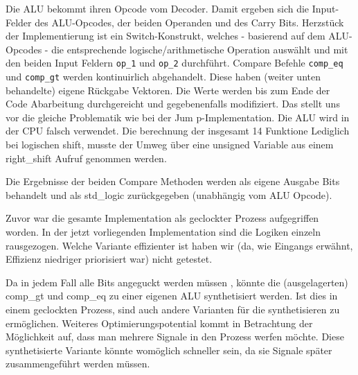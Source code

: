 \documentclass[paper=a4,fontsize=12pt,twocolumn]{scrreprt}
\begin{document}
Die ALU bekommt ihren Opcode vom Decoder.
Damit ergeben sich die Input-Felder des ALU-Opcodes, der beiden Operanden und des Carry Bits.
Herzstück der Implementierung ist ein Switch-Konstrukt, welches - basierend auf dem ALU-Opcodes - die entsprechende logische/arithmetische Operation auswählt und mit den beiden Input Feldern \texttt{op\_1} und \texttt{op\_2} durchführt.
Compare Befehle \texttt{comp\_eq} und \texttt{comp\_gt} werden kontinuirlich abgehandelt. Diese haben (weiter unten behandelte) eigene Rückgabe Vektoren.
Die Werte werden bis zum Ende der Code Abarbeitung durchgereicht und gegebenenfalls modifiziert.
Das stellt uns vor die gleiche Problematik wie bei der Jum
p-Implementation. Die ALU wird in der CPU falsch verwendet.
Die berechnung der insgesamt 14 Funktione Lediglich bei logischen shift, musste der Umweg über eine unsigned Variable aus einem right\_shift Aufruf genommen werden. 

Die Ergebnisse der beiden Compare Methoden werden als eigene Ausgabe Bits behandelt und als std\_logic zurückgegeben (unabhängig vom ALU Opcode).










Zuvor war die gesamte Implementation als geclockter Prozess aufgegriffen worden. In der jetzt vorliegenden Implementation sind die Logiken einzeln rausgezogen. Welche Variante effizienter ist haben wir (da, wie Eingangs erwähnt, Effizienz niedriger priorisiert war) nicht getestet.

Da in jedem Fall alle Bits angeguckt werden müssen , könnte die (ausgelagerten) comp\_gt und comp\_eq zu einer eigenen ALU synthetisiert werden. Ist dies in einem geclockten Prozess, sind auch andere Varianten für die synthetisieren zu ermöglichen.
Weiteres Optimierungspotential kommt in Betrachtung der Möglichkeit auf, dass man mehrere Signale in den Prozess werfen möchte. Diese synthetisierte Variante könnte womöglich schneller sein, da sie Signale später zusammengeführt werden müssen.
\end{document}
